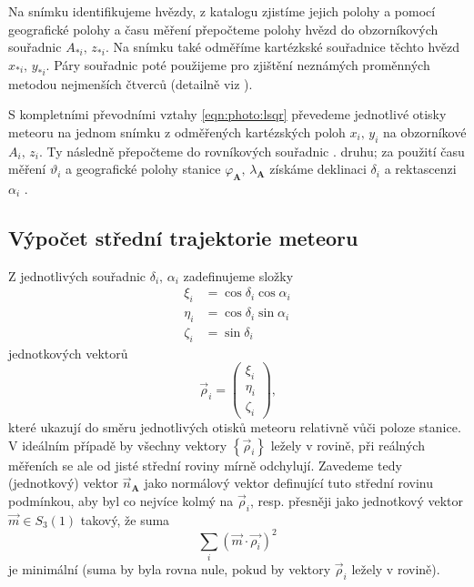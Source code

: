 Na snímku identifikujeme hvězdy, z katalogu zjistíme jejich polohy a pomocí geografické polohy a času měření přepočteme polohy hvězd do obzorníkových souřadnic $A_{\ast i},\,z_{\ast i}$. Na snímku také odměříme kartézkské souřadnice těchto hvězd $x_{\ast i},\,y_{\ast i}$. Páry souřadnic poté použijeme pro zjištění neznámých proměnných metodou nejmenších čtverců (detailně viz \cite[223--224]{ceplecha}).

S kompletními převodními vztahy \eqref{eqn:photo:lsqr} převedeme jednotlivé otisky meteoru na jednom snímku z odměřených kartézských poloh $x_i,\,y_i$ na obzorníkové $A_i,\,z_i$. Ty následně přepočteme do rovníkových souřadnic {\uppercase\expandafter{\relax}}. druhu; za použití času měření $\vartheta_i$ a geografické polohy stanice $\varphi_\mathbf{A},\,\lambda_\mathbf{A}$ získáme deklinaci $\delta_i$ a rektascenzi $\alpha_i$ \cite{ceplecha}.

\subsection{Výpočet střední trajektorie meteoru}
Z jednotlivých souřadnic $\delta_i,\,\alpha_i$ zadefinujeme složky
\begin{equation}
    \begin{aligned}
        \xi_i   & =\cos{\delta_i}\cos{\alpha_i} \\
        \eta_i  & =\cos{\delta_i}\sin{\alpha_i} \\
        \zeta_i & =\sin{\delta_i}
    \end{aligned}
\end{equation}
jednotkových vektorů
$$
    \vec{\rho}_i=\begin{pmatrix}
        \xi_i \\\eta_i\\\zeta_i
    \end{pmatrix}\text{,}
$$
které ukazují do směru jednotlivých otisků meteoru relativně vůči poloze stanice. V ideálním případě by všechny vektory $\left\{\vec{\rho}_i\right\}$ ležely v rovině, při reálných měřeních se ale od jisté střední roviny mírně odchylují. Zavedeme tedy (jednotkový) vektor $\vec{n}_\mathbf{A}$ jako normálový vektor definující tuto střední rovinu podmínkou, aby byl co nejvíce kolmý na $\vec{\rho}_i$, resp. přesněji jako jednotkový vektor $\vec{m}\in S_3(1)$ takový, že suma
$$
    \sum_{i}{\left( \vec{m}\cdot\vec{\rho_i} \right)^2}
$$
je minimální \cite{ceplecha} (suma by byla rovna nule, pokud by vektory $\vec{\rho}_i$ ležely v rovině).

